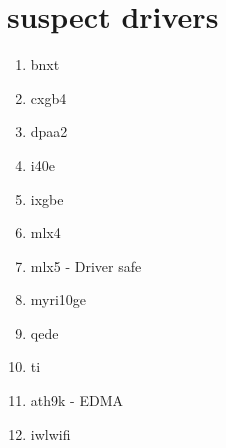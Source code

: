 \newpage
\section{suspect drivers}
\begin{enumerate}
    \item bnxt
    \item cxgb4
    \item dpaa2
    \item i40e
    \item ixgbe
    \item mlx4
    \item mlx5 - Driver safe
    \item myri10ge
    \item qede
    \item ti
    \item ath9k - EDMA
    \item iwlwifi
\end{enumerate}